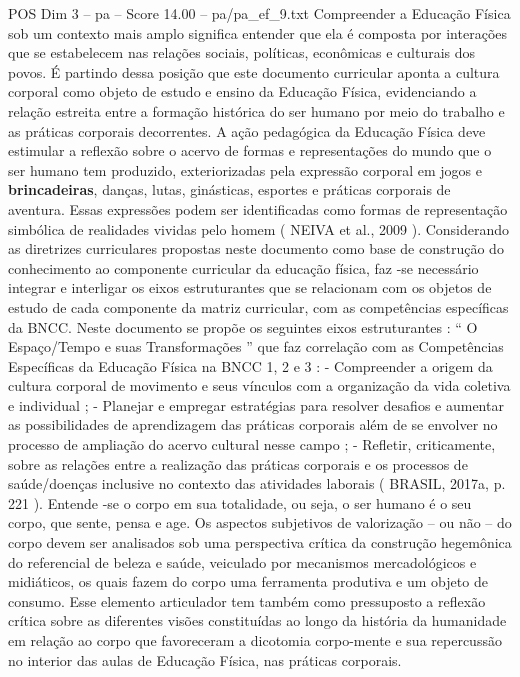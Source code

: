 \begin{textsample}{POS Dim 3 – pa – Score 14.00 – pa/pa\_ef\_9.txt}
Compreender a Educação Física sob um contexto mais amplo significa entender que ela é composta por interações que se estabelecem nas relações sociais, políticas, econômicas e culturais dos povos.
É partindo dessa posição que este documento curricular aponta a cultura corporal como objeto de estudo e ensino da Educação Física, evidenciando a relação estreita entre a formação histórica do ser humano por meio do trabalho e as práticas corporais decorrentes.
A ação pedagógica da Educação Física deve estimular a reflexão sobre o acervo de formas e representações do mundo que o ser humano tem produzido, exteriorizadas pela expressão corporal em jogos e \textbf{brincadeiras}, danças, lutas, ginásticas, esportes e práticas corporais de aventura.
Essas expressões podem ser identificadas como formas de representação simbólica de realidades vividas pelo homem ( NEIVA et al., 2009 ).
Considerando as diretrizes curriculares propostas neste documento como base de construção do conhecimento ao componente curricular da educação física, faz -se necessário integrar e interligar os eixos estruturantes que se relacionam com os objetos de estudo de cada componente da matriz curricular, com as competências específicas da BNCC.
Neste documento se propõe os seguintes eixos estruturantes : “ O Espaço/Tempo e suas Transformações ” que faz correlação com as Competências Específicas da Educação Física na BNCC 1, 2 e 3 : - Compreender a origem da cultura corporal de movimento e seus vínculos com a organização da vida coletiva e individual ; - Planejar e empregar estratégias para resolver desafios e aumentar as possibilidades de aprendizagem das práticas corporais além de se envolver no processo de ampliação do acervo cultural nesse campo ; - Refletir, criticamente, sobre as relações entre a realização das práticas corporais e os processos de saúde/doenças inclusive no contexto das atividades laborais ( BRASIL, 2017a, p. 221 ).
Entende -se o corpo em sua totalidade, ou seja, o ser humano é o seu corpo, que sente, pensa e age.
Os aspectos subjetivos de valorização – ou não – do corpo devem ser analisados sob uma perspectiva crítica da construção hegemônica do referencial de beleza e saúde, veiculado por mecanismos mercadológicos e midiáticos, os quais fazem do corpo uma ferramenta produtiva e um objeto de consumo.
Esse elemento articulador tem também como pressuposto a reflexão crítica sobre as diferentes visões constituídas ao longo da história da humanidade em relação ao corpo que favoreceram a dicotomia corpo-mente e sua repercussão no interior das aulas de Educação Física, nas práticas corporais.

\end{textsample}
